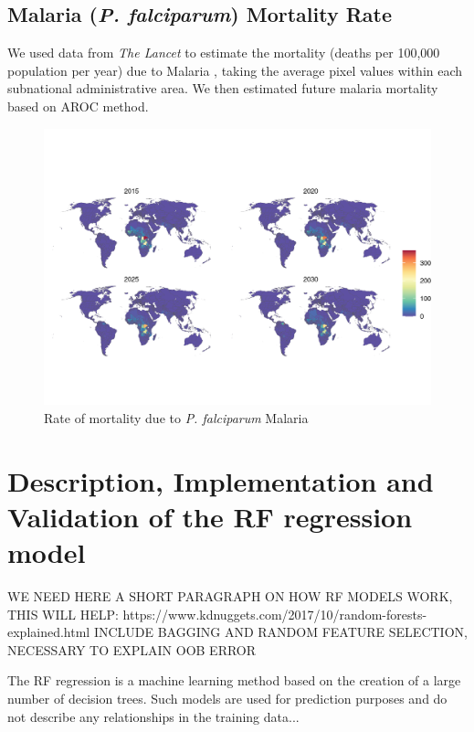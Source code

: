 \documentclass{article}
\begin{document}
\subsection{Malaria (\textit{P. falciparum}) Mortality Rate}
We used data from \textit{The Lancet} to estimate the mortality (deaths per 100,000 population per year) due to Malaria \citep{Weiss2019}, taking the average pixel values within each subnational administrative area.  We then estimated future malaria mortality based on AROC method.

\begin{figure}[H]
  \centering
  \includegraphics[width=\linewidth]{img/covars/mal_falciparum.png}
  \caption{Rate of mortality due to \textit{P. falciparum} Malaria}
\end{figure}

\section{Description, Implementation and Validation of the RF regression model}

WE NEED HERE A SHORT PARAGRAPH ON HOW RF MODELS WORK, THIS WILL HELP: https://www.kdnuggets.com/2017/10/random-forests-explained.html
INCLUDE BAGGING AND RANDOM FEATURE SELECTION, NECESSARY TO EXPLAIN OOB ERROR



The RF regression is a machine learning method based on the creation of a large number of decision trees. Such models are used for prediction purposes and do not describe any relationships in the training data... 
\end{document}
